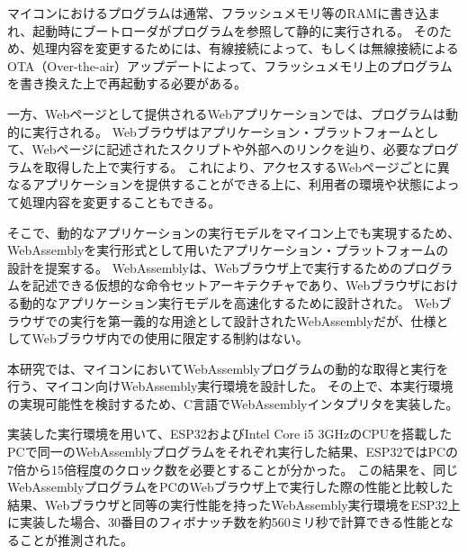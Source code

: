 \begin{jabstract}

  マイコンにおけるプログラムは通常、フラッシュメモリ等のRAMに書き込まれ、起動時にブートローダがプログラムを参照して静的に実行される。
  そのため、処理内容を変更するためには、有線接続によって、もしくは無線接続によるOTA（Over-the-air）アップデートによって、フラッシュメモリ上のプログラムを書き換えた上で再起動する必要がある。

  一方、Webページとして提供されるWebアプリケーションでは、プログラムは動的に実行される。
  Webブラウザはアプリケーション・プラットフォームとして、Webページに記述されたスクリプトや外部へのリンクを辿り、必要なプログラムを取得した上で実行する。
  これにより、アクセスするWebページごとに異なるアプリケーションを提供することができる上に、利用者の環境や状態によって処理内容を変更することもできる。

  そこで、動的なアプリケーションの実行モデルをマイコン上でも実現するため、WebAssemblyを実行形式として用いたアプリケーション・プラットフォームの設計を提案する。
  WebAssemblyは、Webブラウザ上で実行するためのプログラムを記述できる仮想的な命令セットアーキテクチャであり、Webブラウザにおける動的なアプリケーション実行モデルを高速化するために設計された。
  Webブラウザでの実行を第一義的な用途として設計されたWebAssemblyだが、仕様としてWebブラウザ内での使用に限定する制約はない。

  本研究では、マイコンにおいてWebAssemblyプログラムの動的な取得と実行を行う、マイコン向けWebAssembly実行環境を設計した。
  その上で、本実行環境の実現可能性を検討するため、C言語でWebAssemblyインタプリタを実装した。

  実装した実行環境を用いて、ESP32およびIntel Core i5 3GHzのCPUを搭載したPCで同一のWebAssemblyプログラムをそれぞれ実行した結果、ESP32ではPCの7倍から15倍程度のクロック数を必要とすることが分かった。
  この結果を、同じWebAssemblyプログラムをPCのWebブラウザ上で実行した際の性能と比較した結果、Webブラウザと同等の実行性能を持ったWebAssembly実行環境をESP32上に実装した場合、30番目のフィボナッチ数を約560ミリ秒で計算できる性能となることが推測された。

\end{jabstract}
